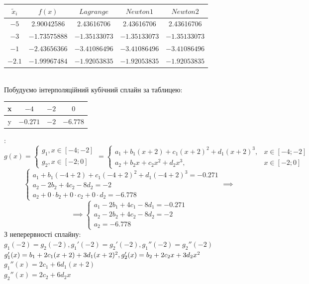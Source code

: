 \documentclass[14 pt]{extarticle}
\begin{document}
\begin{tabular}{|c|c|c|c|c|} \hline
    $\tilde{x}_i$&$f(x)$ & $Lagrange$ & $Newton 1$ & $Newton 2$ \\ \hline    
    $-5$&2.90042586 & 2.43616706&2.43616706&2.43616706 \\ \hline
    $-3$&$-1.73575888$& $-1.35133073$&$-1.35133073$&$-1.35133073$ \\ \hline
    $-1$&$-2.43656366$&$-3.41086496$&$-3.41086496$&$-3.41086496$ \\ \hline
    $-2.1$&$-1.99967484$&$-1.92053835$&$-1.92053835$&$-1.92053835$ \\ \hline
\end{tabular} \\ 
Побудуємо інтерполяційний кубічний сплайн за таблицею:
\begin{tabular}{c|c|c|c|}
    x&$-4$&$-2$&$0$ \\ \hline
    y&$-0.271$&$-2$&$-6.778$
\end{tabular}:
$$
g(x) = \begin{cases}
    g_1, x \in [-4;-2] \\ 
    g_2, x \in [-2;0]
\end{cases}
=\begin{cases}
    a_1 + b_1 (x+2) + c_1 (x+2)^2 + d_1 (x+2)^3, & x \in [-4;-2] \\ 
    a_2 + b_2 x + c_2 x^2 + d_2 x^3, & x \in [-2;0]
\end{cases}
$$
$$
\begin{cases}
    a_1 + b_1 (-4+2) + c_1 (-4+2)^2 + d_1 (-4+2)^3 = -0.271 \\ 
    a_2 - 2 b_2 + 4 c_2 - 8 d_2 = -2 \\ 
    a_2 + 0 \cdot b_2 + 0 \cdot c_2 + 0 \cdot d_2 = -6.778
\end{cases} \implies$$$$ \implies
\begin{cases}
    a_1 - 2b_1 + 4 c_1 - 8 d_1 = -0.271 \\ 
    a_2 - 2 b_2 + 4 c_2 - 8 d_2 = -2 \\ 
    a_2 = -6.778
\end{cases}
$$
З неперервності сплайну: $g_1(-2) = g_2(-2), g_1'(-2) = g_2'(-2), g_1''(-2) = g_2''(-2)$
\\ 
$g_1'(x) = b_1 + 2c_1 (x+2) + 3d_1 (x+2)^2,\\ g_2'(x) = b_2 + 2c_2 x + 3d_2 x^2$ \\ 
$g_1''(x) = 2c_1 + 6d_1 (x+2)$ \\ 
$g_2''(x) = 2c_2 + 6d_2 x$ \\
\end{document}
